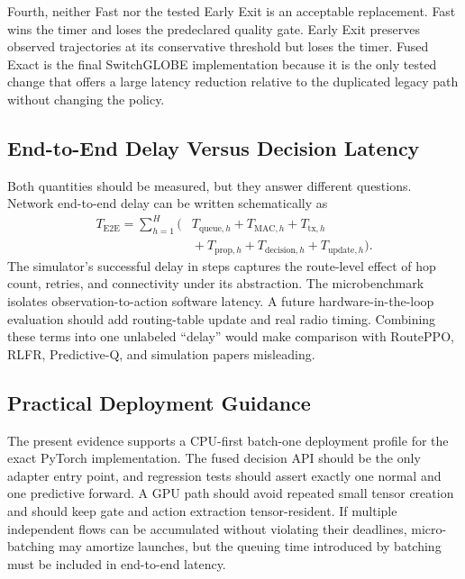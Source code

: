 \documentclass{ieeeaccess}
\newcommand{\SG}{SwitchGLOBE}
\begin{document}
Fourth, neither Fast nor the tested Early Exit is an acceptable replacement. Fast wins the timer and loses the predeclared quality gate. Early Exit preserves observed trajectories at its conservative threshold but loses the timer. Fused Exact is the final \SG{} implementation because it is the only tested change that offers a large latency reduction relative to the duplicated legacy path without changing the policy.

\subsection{End-to-End Delay Versus Decision Latency}

Both quantities should be measured, but they answer different questions. Network end-to-end delay can be written schematically as
\begin{equation}
\begin{aligned}
T_{\mathrm{E2E}}=\sum_{h=1}^{H}\big(&T_{\mathrm{queue},h}+T_{\mathrm{MAC},h}
+T_{\mathrm{tx},h}\\
&{}+T_{\mathrm{prop},h}+T_{\mathrm{decision},h}
+T_{\mathrm{update},h}\big).
\end{aligned}
\end{equation}
The simulator's successful delay in steps captures the route-level effect of hop count, retries, and connectivity under its abstraction. The microbenchmark isolates observation-to-action software latency. A future hardware-in-the-loop evaluation should add routing-table update and real radio timing. Combining these terms into one unlabeled ``delay'' would make comparison with RoutePPO, RLFR, Predictive-Q, and simulation papers misleading.

\subsection{Practical Deployment Guidance}

The present evidence supports a CPU-first batch-one deployment profile for the exact PyTorch implementation. The fused decision API should be the only adapter entry point, and regression tests should assert exactly one normal and one predictive forward. A GPU path should avoid repeated small tensor creation and should keep gate and action extraction tensor-resident. If multiple independent flows can be accumulated without violating their deadlines, micro-batching may amortize launches, but the queuing time introduced by batching must be included in end-to-end latency.
\end{document}
